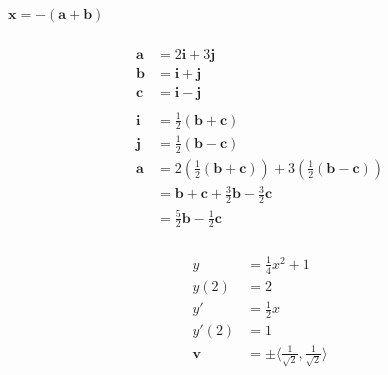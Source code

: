 \documentclass{article}
\begin{document}
\subsubsection{}

$\mathbf{x} = -(\mathbf{a} + \mathbf{b})$

\setcounter{subsubsection}{40}
\subsubsection{}

\begin{align*}
  \mathbf{a} & = 2 \mathbf{i} + 3 \mathbf{j}                                                                                     \\
  \mathbf{b} & = \mathbf{i} + \mathbf{j}                                                                                         \\
  \mathbf{c} & = \mathbf{i} - \mathbf{j}                                                                                         \\ \\
  \mathbf{i} & = \frac{1}{2} (\mathbf{b} + \mathbf{c})                                                                           \\
  \mathbf{j} & = \frac{1}{2} (\mathbf{b} - \mathbf{c})                                                                           \\
  \mathbf{a} & = 2 \left( \frac{1}{2} (\mathbf{b} + \mathbf{c}) \right) + 3 \left( \frac{1}{2} (\mathbf{b} - \mathbf{c}) \right) \\
             & = \mathbf{b} + \mathbf{c} + \frac{3}{2} \mathbf{b} - \frac{3}{2} \mathbf{c}                                       \\
             & = \frac{5}{2} \mathbf{b} - \frac{1}{2} \mathbf{c}
\end{align*}

\setcounter{subsubsection}{42}
\subsubsection{}

\begin{align*}
  y          & = \frac{1}{4} x^2 + 1                                        \\
  y(2)       & = 2                                                          \\
  y'         & = \frac{1}{2} x                                              \\
  y'(2)      & = 1                                                          \\
  \mathbf{v} & = \pm \langle \frac{1}{\sqrt{2}}, \frac{1}{\sqrt{2}} \rangle
\end{align*}
\end{document}
